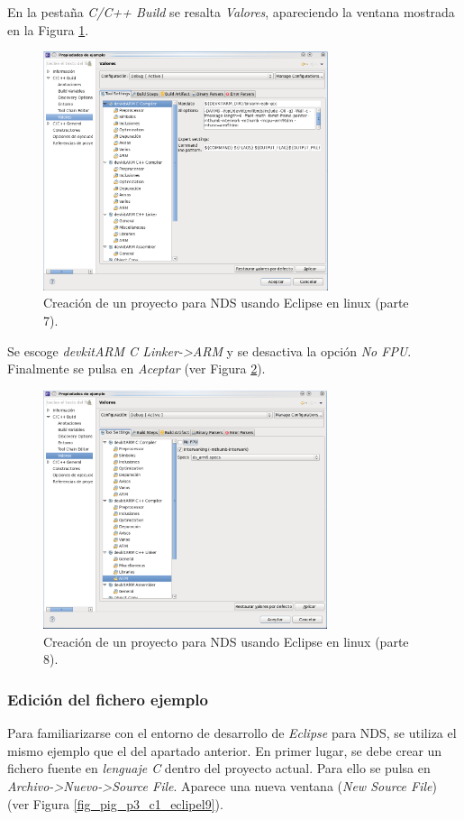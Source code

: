 En la pestaña \textit{C/C++ Build} se resalta \textit{Valores}, apareciendo la ventana mostrada en la Figura \ref{fig_pig_p3_c1_eclipel7}.


\begin{figure}[t]
	\centering
	\includegraphics[height=7cm]{./Figuras/C2/c2_instan7.png}
	\caption{Creación de un proyecto para NDS usando Eclipse en linux (parte 7).}
	\label{fig_pig_p3_c1_eclipel7}
\end{figure}

Se escoge \textit{devkitARM C Linker->ARM} y se desactiva la opción \textit{No FPU}. Finalmente se pulsa en \textit{Aceptar} (ver Figura \ref{fig_pig_p3_c1_eclipel8}).

\begin{figure}[t]
	\centering
	\includegraphics[height=7cm]{./Figuras/C2/c2_instan8.png}
	\caption{Creación de un proyecto para NDS usando Eclipse en linux (parte 8).}
	\label{fig_pig_p3_c1_eclipel8}
\end{figure}


\subsubsection{Edición del fichero ejemplo}
Para familiarizarse con el entorno de desarrollo de \textit{Eclipse} para NDS, se utiliza el mismo ejemplo que el del apartado anterior.  En primer lugar, se debe crear un fichero fuente en \textit{lenguaje C} dentro del proyecto actual. Para ello se pulsa en \textit{Archivo->Nuevo->Source File}. Aparece una nueva ventana (\textit{New Source File}) (ver Figura \ref{fig_pig_p3_c1_eclipel9}).

